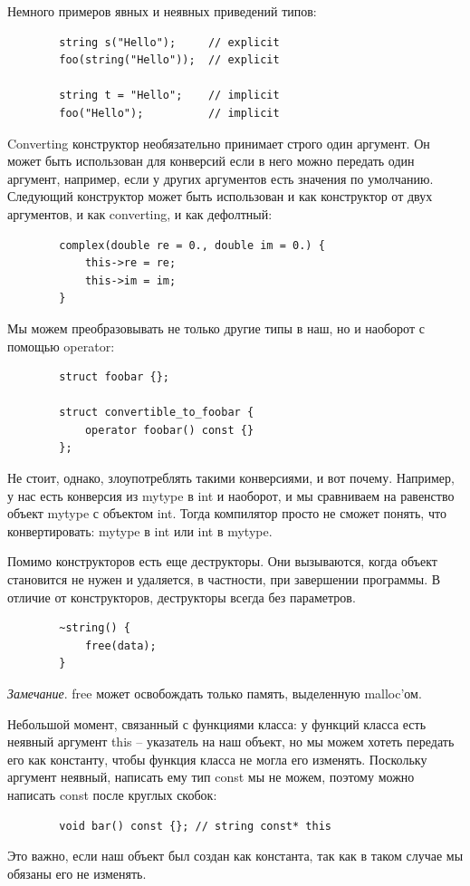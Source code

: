 \documentclass[12pt, a4paper]{article}
\begin{document}
	\par Немного примеров явных и неявных приведений типов:
	\begin{verbatim}
		string s("Hello");     // explicit
		foo(string("Hello"));  // explicit
		
		string t = "Hello";    // implicit
		foo("Hello");          // implicit
	\end{verbatim}
	\par Converting конструктор необязательно принимает строго один аргумент. Он может быть использован для конверсий если в него можно передать один аргумент, например, если у других аргументов есть значения по умолчанию. Следующий конструктор может быть использован и как конструктор от двух аргументов, и как converting, и как дефолтный:
	\begin{verbatim}
		complex(double re = 0., double im = 0.) {
			this->re = re;
			this->im = im;
		}
	\end{verbatim}
	\par Мы можем преобразовывать не только другие типы в наш, но и наоборот с помощью operator:
	\begin{verbatim}
		struct foobar {};
		
		struct convertible_to_foobar {
			operator foobar() const {}
		};
	\end{verbatim}
	Не стоит, однако, злоупотреблять такими конверсиями, и вот почему. Например, у нас есть конверсия из mytype в int и наоборот, и мы сравниваем на равенство объект mytype с объектом int. Тогда компилятор просто не сможет понять, что конвертировать: mytype в int или int в mytype.
	\\\par Помимо конструкторов есть еще деструкторы. Они вызываются, когда объект становится не нужен и удаляется, в частности, при завершении программы. В отличие от конструкторов, деструкторы всегда без параметров.
	\begin{verbatim}
		~string() {
			free(data);
		}
	\end{verbatim}
	\textit{Замечание}. free может освобождать только память, выделенную malloc'ом.
	\\\par Небольшой момент, связанный с функциями класса: у функций класса есть неявный аргумент this -- указатель на наш объект, но мы можем хотеть передать его как константу, чтобы функция класса не могла его изменять. Поскольку аргумент неявный, написать ему тип const мы не можем, поэтому можно написать const после круглых скобок:
	\begin{verbatim}
		void bar() const {}; // string const* this
	\end{verbatim}
	Это важно, если наш объект был создан как константа, так как в таком случае мы обязаны его не изменять.
\end{document}
